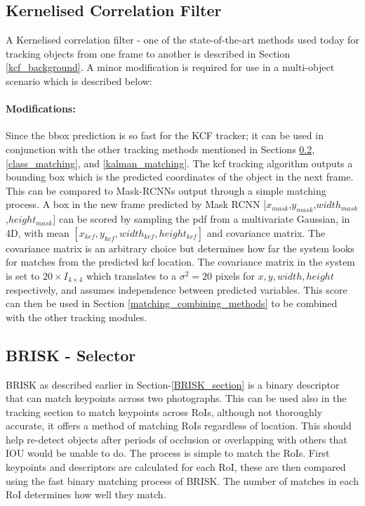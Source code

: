 \documentclass[11pt,twoside]{report}
\begin{document}
\subsection{Kernelised Correlation Filter}
A Kernelised correlation filter - one of the state-of-the-art methods used today for tracking objects from one frame to another is described in Section \ref{kcf_background}. A minor modification is required for use in a multi-object scenario which is described below:

\paragraph{Modifications:}
Since the bbox prediction is so fast for the KCF tracker; it can be used in conjunction with the other tracking methods mentioned in Sections \ref{BRISK_matching}, \ref{class_matching}, and \ref{kalman_matching}. The kcf tracking algorithm outputs a bounding box which is the predicted coordinates of the object in the next frame. This can be compared to Mask-RCNNs output through a simple matching process. A box in the new frame predicted by Mask RCNN $[x_{mask}$,$y_{mask}$,$width_{mask}$,$height_{mask}]$ can be scored by sampling the pdf from a multivariate Gaussian, in 4D, with mean $[x_{kcf},y_{kcf},width_{kcf},height_{kcf}]$ and covariance matrix. The covariance matrix is an arbitrary choice but determines how far the system looks for matches from the predicted kcf location. The covariance matrix in the system is set to $20 \times I_{4 \times 4}$ which translates to a $\sigma^{2} = 20$ pixels for $x,y,width,height$ respectively, and assumes independence between predicted variables. This score can then be used in Section \ref{matching_combining_methods} to be combined with the other tracking modules.


\subsection{BRISK - Selector} \label{BRISK_matching}
BRISK as described earlier in Section-\ref{BRISK_section} is a binary descriptor that can match keypoints across two photographs. This can be used also in the tracking section to match keypoints across RoIs, although not thoroughly accurate, it offers a method of matching RoIs regardless of location. This should help re-detect objects after periods of occlusion or overlapping with others that IOU would be unable to do. The process is simple to match the RoIs. First keypoints and descriptors are calculated for each RoI, these are then compared using the fast binary matching process of BRISK. The number of matches in each RoI determines how well they match.
\end{document}
